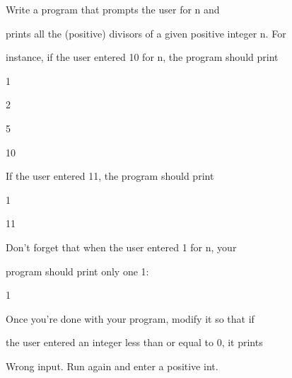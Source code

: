 Write a program that prompts the user for n and

prints all the (positive) divisors of a given positive integer n. For

instance, if the user entered 10 for n, the program should print

\begin{console}

1

2

5

10

\end{console}

If the user entered 11, the program should print

\begin{console}

1

11

\end{console}

Don't forget that when the user entered 1 for n, your

program should print only one 1:

\begin{console}

1

\end{console}

Once you're done with your program, modify it so that if

the user entered an integer less than or equal to 0, it prints

\begin{console}

Wrong input. Run again and enter a positive int.

\end{console}

